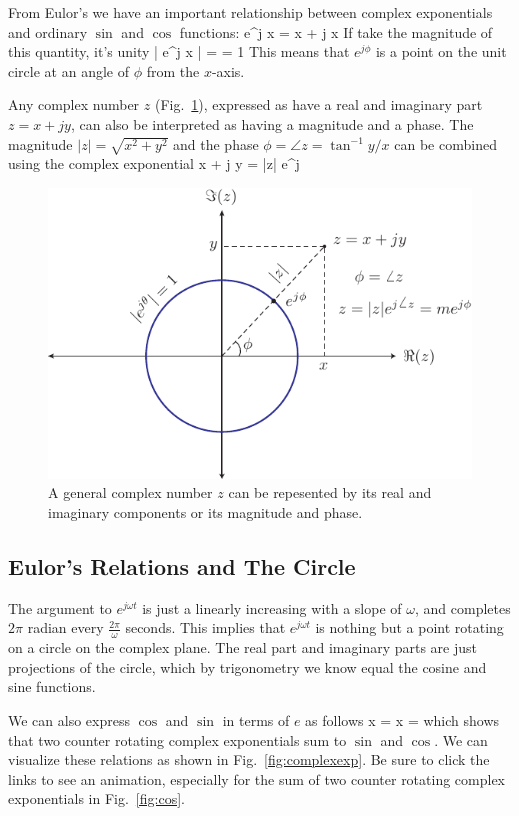 From Eulor's we have an important relationship between complex exponentials and ordinary $\sin$ and $\cos$ functions:
\be  e^{j x} = \cos x + j \sin x \ee
If take the magnitude of this quantity, it's unity
\be | e^{j x} | =   = 1 \ee
This means that $e^{j\phi}$ is a point on the unit circle at an angle of $\phi$ from the $x$-axis. 

Any complex number $z$ (Fig.~\ref{fig:complex}), expressed as have a real and imaginary part $ z = x + j y$, can also be interpreted as having a magnitude and a phase.  The magnitude  $|z| = \sqrt{x^2 + y^2}$ and the phase $\phi = \angle z = \tan^{-1} y/x$ can be combined using the complex exponential
\be
     x + j y = |z| e^{j\phi}
\ee

\begin{figure}[tb]
\begin{center}
\includegraphics[width=.6\columnwidth]{complex}
\end{center}
\caption{A general complex number $z$ can be repesented by its real and imaginary components or its magnitude and phase. } \label{fig:complex}
\end{figure}



\subsection{Eulor's Relations and The Circle}


The argument to $e^{j \omega t}$ is just a linearly increasing with a slope of $\omega$, and completes $2\pi$ radian every $\frac{2\pi}{\omega}$ seconds.  This implies that $e^{j \omega t}$ is nothing but a point rotating on a circle on the complex plane.  The real part and imaginary parts are just projections of the circle, which by trigonometry we know equal the cosine and sine functions.

 We can also express $\cos$ and $\sin$ in terms of $e$ as follows
\be
         \cos x = 
\ee
\be     \sin x =  
\ee
which shows that two counter rotating complex exponentials sum to $\sin$ and $\cos$.  We can visualize these relations as shown in Fig.~\ref{fig:complexexp}.  Be sure to click the links to see an animation, especially for the sum of two counter rotating complex exponentials in Fig.~\ref{fig:cos}.


